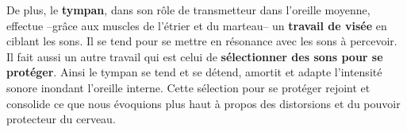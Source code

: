 De plus, le \textbf{tympan}, dans son rôle de transmetteur dans l'oreille
          moyenne, effectue --grâce aux muscles de l'étrier et du marteau--
		un\textbf{ travail de visée} en ciblant les sons. Il
se tend
		pour se mettre en résonance avec les sons à percevoir.
               Il fait aussi un autre travail qui est celui de \textbf{sélectionner des
sons
		pour se protéger}. Ainsi le tympan se tend et se détend,
              amortit et adapte
l'intensité
		sonore inondant  l'oreille interne. Cette sélection pour se  protéger rejoint et consolide ce que nous 
		évoquions plus haut à propos des 
distorsions et du pouvoir protecteur du cerveau.




